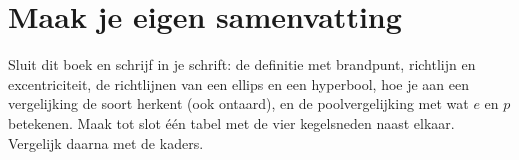 
\begin{oefeningen}





\end{oefeningen}


\ifzelfstudie
\section*{Maak je eigen samenvatting}
Sluit dit boek en schrijf in je schrift: de definitie met brandpunt, richtlijn en excentriciteit, de richtlijnen van een ellips en een hyperbool, hoe je aan een vergelijking de soort herkent (ook ontaard), en de poolvergelijking met wat $e$ en $p$ betekenen. Maak tot slot één tabel met de vier kegelsneden naast elkaar. Vergelijk daarna met de kaders.
\fi
